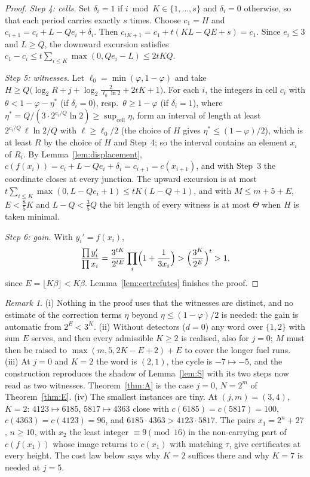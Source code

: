 \documentclass[11pt]{article}
\theoremstyle{definition}
\theoremstyle{remark}
\newtheorem{remark}[theorem]{Remark}
\begin{document}
\begin{proof}
\emph{Step 4: cells.} Set $\delta_i=1$ if $i\bmod K\in\{1,\dots,s\}$ and
$\delta_i=0$ otherwise, so that each period carries exactly $s$ times.
Choose $c_1=H$ and $c_{i+1}=c_i+L-Qe_i+\delta_i$. Then
$c_{tK+1}=c_1+t(KL-QE+s)=c_1$. Since $e_i\le3$ and $L\ge Q$, the
downward excursion satisfies
$c_1-c_i\le t\sum_{i\le K}\max(0,Qe_i-L)\le2tKQ$.

\emph{Step 5: witnesses.} Let $\ell_0=\min(\varphi,1-\varphi)$ and take
$H\ge Q\bigl(\log_2R+j+\log_2\tfrac{2}{\ell_0\ln2}+2tK+1\bigr)$.
For each $i$, the integers in cell $c_i$ with $\theta<1-\varphi-\eta^{*}$
(if $\delta_i=0$), resp.\ $\theta\ge1-\varphi$ (if $\delta_i=1$), where
$\eta^{*}=Q/(3\cdot2^{c_i/Q}\ln2)\ge\sup_{\text{cell}}\eta$, form an
interval of length at least $2^{c_i/Q}\,\ell\ln2/Q$ with
$\ell\ge\ell_0/2$ (the choice of $H$ gives $\eta^{*}\le(1-\varphi)/2$),
which is at least $R$ by the choice of $H$ and Step~4; so the interval
contains an element $x_i$ of $R_i$. By Lemma~\ref{lem:displacement},
$c(f(x_i))=c_i+L-Qe_i+\delta_i=c_{i+1}=c(x_{i+1})$, and with Step~3 the
coordinate closes at every junction. The upward excursion is at most
$t\sum_{i\le K}\max(0,L-Qe_i+1)\le tK(L-Q+1)$, and with
$M\le m+5+E$, $E<\tfrac{8}{5}K$ and $L-Q<\tfrac35Q$ the bit length of
every witness is at most $\Theta$ when $H$ is taken minimal.

\emph{Step 6: gain.} With $y_i'=f(x_i)$,
\[
\frac{\prod y_i'}{\prod x_i}
=\frac{3^{tK}}{2^{tE}}\prod_{i}\Bigl(1+\frac1{3x_i}\Bigr)
>\Bigl(\frac{3^{K}}{2^{E}}\Bigr)^{t}>1,
\]
since $E=\lfloor K\beta\rfloor<K\beta$. Lemma~\ref{lem:certrefutes}
finishes the proof.
\end{proof}

\begin{remark}\label{rem:F}
(i) Nothing in the proof uses that the witnesses are distinct, and
no estimate of the correction terms $\eta$ beyond $\eta\le(1-\varphi)/2$
is needed: the gain is automatic from $2^{E}<3^{K}$.
(ii) Without detectors ($d=0$) any word over $\{1,2\}$ with sum $E$
serves, and then every admissible $K\ge2$ is realised, also for $j=0$;
$M$ must then be raised to $\max(m,5,2K-E+2)+E$ to cover the longer
fuel runs.
(iii) At $j=0$ and $K=2$ the word is $(2,1)$, the cycle is $-7\mapsto-5$,
and the construction reproduces the shadow of Lemma~\ref{lem:S} with its
two steps now read as two witnesses. Theorem~\ref{thm:A} is the case
$j=0$, $N=2^{m}$ of Theorem~\ref{thm:E}.
(iv) The smallest instances are tiny. At $(j,m)=(3,4)$, $K=2$:
$4123\mapsto6185$, $5817\mapsto4363$ close with
$c(6185)=c(5817)=100$, $c(4363)=c(4123)=96$, and
$6185\cdot4363>4123\cdot5817$. The pairs $x_1=2^{n}+27$, $n\ge10$,
with $x_2$ the least integer $\equiv9\pmod{16}$ in the non-carrying
part of $c(f(x_1))$ whose image returns to $c(x_1)$ with matching $\tau$,
give certificates at every height. The cost law below says why $K=2$
suffices there and why $K=7$ is needed at $j=5$.
\end{remark}
\end{document}
